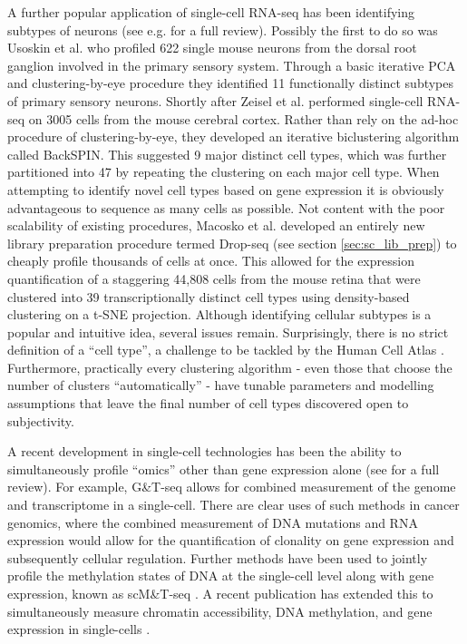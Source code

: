 A further popular application of single-cell RNA-seq has been identifying subtypes of neurons (see e.g. \cite{Poulin2016-bl} for a full review). Possibly the first to do so was Usoskin et al. \cite{Usoskin2015-gp} who profiled 622 single mouse neurons from the dorsal root ganglion involved in the primary sensory system. Through a basic iterative PCA and clustering-by-eye procedure they identified 11 functionally distinct subtypes of primary sensory neurons. Shortly after Zeisel et al. \cite{Zeisel2015-cv} performed single-cell RNA-seq on 3005 cells from the mouse cerebral cortex. Rather than rely on the ad-hoc procedure of clustering-by-eye, they developed an iterative biclustering algorithm called BackSPIN. This suggested 9 major distinct cell types, which was further partitioned into 47 by repeating the clustering on each major cell type. When attempting to identify novel cell types based on gene expression it is obviously advantageous to sequence as many cells as possible. Not content with the poor scalability of existing procedures, Macosko et al. \cite{Macosko2015-ek} developed an entirely new library preparation procedure termed Drop-seq (see section \ref{sec:sc_lib_prep}) to cheaply profile thousands of cells at once. This allowed for the expression quantification of a staggering 44,808 cells from the mouse retina that were clustered into 39 transcriptionally distinct cell types using density-based clustering on a t-SNE projection. Although identifying cellular subtypes is a popular and intuitive idea, several issues remain. Surprisingly, there is no strict definition of a ``cell type'', a challenge to be tackled by the Human Cell Atlas \cite{Regev2017-sl}. Furthermore, practically every clustering algorithm - even those that choose the number of clusters ``automatically'' - have tunable parameters and modelling assumptions that leave the  final number of cell types discovered open to subjectivity.

A recent development in single-cell technologies has been the ability to simultaneously profile ``omics'' other than gene expression alone (see \cite{Macaulay2017-nn} for a full review). For example, G\&T-seq \cite{Macaulay2015-ok} allows for combined measurement of the genome and transcriptome in a single-cell. There are clear uses of such methods in cancer genomics, where the combined measurement of DNA mutations and RNA expression would allow for the quantification of clonality on gene expression and subsequently cellular regulation. Further methods have been used to jointly profile the methylation states of DNA at the single-cell level along with gene expression, known as scM\&T-seq 
\cite{Angermueller2016-ll,Hu2016-bz}. A recent publication has extended this to simultaneously measure chromatin accessibility, DNA methylation, and gene expression in single-cells \cite{Clark2017-pc}.

